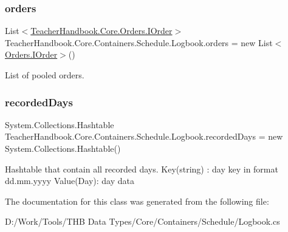 \subsubsection{\texorpdfstring{orders}{orders}}
{\footnotesize\ttfamily List$<$\mbox{\hyperlink{interface_teacher_handbook_1_1_core_1_1_orders_1_1_i_order}{Teacher\+Handbook.\+Core.\+Orders.\+I\+Order}}$>$ Teacher\+Handbook.\+Core.\+Containers.\+Schedule.\+Logbook.\+orders = new List$<$\mbox{\hyperlink{interface_teacher_handbook_1_1_core_1_1_orders_1_1_i_order}{Orders.\+I\+Order}}$>$()\hspace{0.3cm}{\ttfamily [protected]}}



List of pooled orders. 

\mbox{\label{class_teacher_handbook_1_1_core_1_1_containers_1_1_schedule_1_1_logbook_ac848ae0c5ec991bae660417d0b96a13c}} 
\subsubsection{\texorpdfstring{recorded\+Days}{recordedDays}}
{\footnotesize\ttfamily System.\+Collections.\+Hashtable Teacher\+Handbook.\+Core.\+Containers.\+Schedule.\+Logbook.\+recorded\+Days = new System.\+Collections.\+Hashtable()\hspace{0.3cm}{\ttfamily [protected]}}



Hashtable that contain all recorded days. Key(string) \+: day key in format dd.\+mm.\+yyyy Value(\+Day)\+: day data 



The documentation for this class was generated from the following file\+:\begin{DoxyCompactItemize}
\item 
D\+:/\+Work/\+Tools/\+T\+H\+B Data Types/\+Core/\+Containers/\+Schedule/Logbook.\+cs\end{DoxyCompactItemize}
